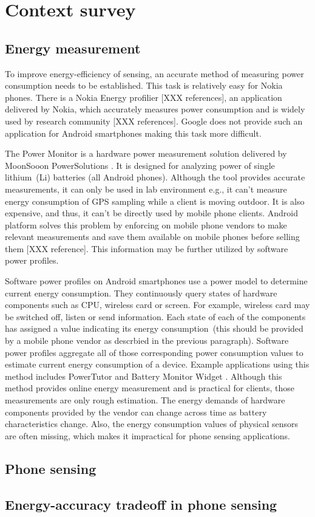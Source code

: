 \section{Context survey}
\label{s:contextsurvey}
\subsection{Energy measurement}
\hspace{10pt} To improve energy-efficiency of sensing, an accurate method of measuring power consumption needs to be established. This task is relatively easy for Nokia phones. There is a Nokia Energy profilier [XXX references], an application delivered by Nokia, which accurately measures power consumption and is widely used by research community [XXX references]. Google does not provide such an application for Android smartphones making this task more difficult.

The Power Monitor is a hardware power measurement solution delivered by MoonSooon PowerSolutions \cite{monsoon:powermonitor}.  It is designed for analyzing power of single lithium\ (Li) batteries (all Android phones). Although the tool provides accurate measurements, it can only be used in lab environment e.g., it can't measure energy consumption of GPS sampling while a client is moving outdoor. It is also expensive, and thus, it can't be directly used by mobile phone clients. Android platform solves this problem by enforcing on mobile phone vendors to make relevant measurements and save them available on mobile phones before selling them [XXX reference]. This information may be further utilized by software power profiles.

Software power profiles on Android smartphones use a power model to determine current energy consumption. They continuously query states of hardware components such as CPU, wireless card or screen. For example, wireless card may be switched off, listen or send information. Each state of each of the components has assigned a value indicating its energy consumption\ (this should be provided by a mobile phone vendor as descrbied in the previous paragraph). Software power profiles aggregate all of those corresponding power consumption values to estimate current energy consumption of a device. Example applications using this method includes PowerTutor \cite{zhang:powertutor} and Battery Monitor Widget \cite{googleplay:batterymonitorwidget}. Although this method provides online energy measurement and is practical for clients, those measurements are only rough estimation. The energy demands of hardware components provided by the vendor can change across time as battery characteristics change. Also, the energy consumption values of physical sensors are often missing, which makes it impractical for phone sensing applications.





\subsection{Phone sensing}
\subsection{Energy-accuracy tradeoff in phone sensing}